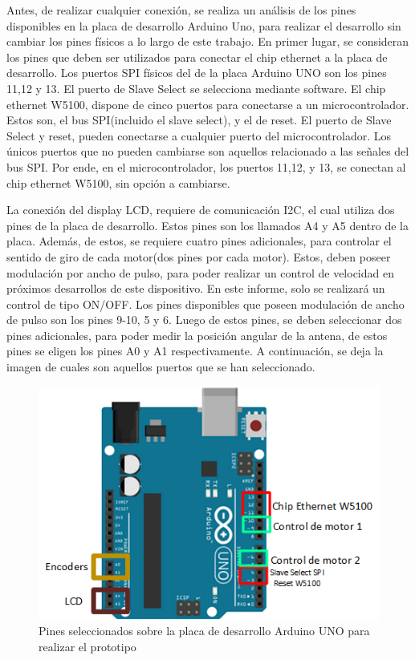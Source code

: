 Antes, de realizar cualquier conexión, se realiza un análisis de los pines disponibles en la placa de desarrollo Arduino Uno, para realizar el desarrollo sin cambiar los pines físicos a lo largo de este trabajo. En primer lugar, se consideran los pines que deben ser utilizados para conectar el chip ethernet a la placa de desarrollo. Los puertos SPI físicos del de la placa Arduino UNO son los pines 11,12 y 13. El puerto de Slave Select se selecciona mediante software. El chip ethernet W5100, dispone de cinco puertos para conectarse a un microcontrolador. Estos son, el bus SPI(incluido el slave select), y el de reset. El puerto de Slave Select y reset, pueden conectarse a cualquier puerto del microcontrolador. Los únicos puertos que no pueden cambiarse son aquellos relacionado a las señales del bus SPI. Por ende, en el microcontrolador, los puertos 11,12, y 13, se conectan al chip ethernet W5100, sin opción a cambiarse.    

La conexión del display LCD, requiere de comunicación I2C, el cual utiliza dos pines de la placa de desarrollo. Estos pines son los llamados A4 y A5 dentro de la placa. Además, de estos, se requiere cuatro pines adicionales, para controlar el sentido de giro de cada motor(dos pines por cada motor). Estos, deben poseer modulación por ancho de pulso, para poder realizar un control de velocidad en próximos desarrollos de este dispositivo. En este informe, solo se realizará un control de tipo ON/OFF. Los pines disponibles que poseen modulación de ancho de pulso son los pines 9-10, 5 y 6. Luego de estos pines, se deben seleccionar dos pines adicionales, para poder medir la posición angular de la antena, de estos pines se eligen los pines A0 y A1 respectivamente. A continuación, se deja la imagen de cuales son aquellos puertos que se han seleccionado.   

\begin{figure}[H]
	\centering
	\includegraphics{pines_ard_uno}
	\caption{Pines seleccionados sobre la placa de desarrollo Arduino UNO para realizar el prototipo}
	\label{fig:pin_select_ard_uno}
\end{figure}


